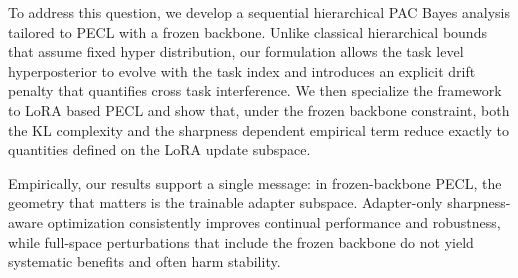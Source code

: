 \documentclass{article}
\theoremstyle{plain}
\theoremstyle{definition}
\theoremstyle{remark}
\begin{document}
To address this question, we develop a sequential hierarchical PAC Bayes analysis tailored to PECL with a frozen backbone. Unlike classical hierarchical bounds that assume fixed hyper distribution, our formulation allows the task level hyperposterior to evolve with the task index and introduces an explicit drift penalty that quantifies cross task interference. We then specialize the framework to LoRA based PECL and show that, under the frozen backbone constraint, both the KL complexity and the sharpness dependent empirical term reduce exactly to quantities defined on the LoRA update subspace.


Empirically, our results support a single message: in frozen-backbone PECL, the geometry that matters is the trainable adapter subspace. Adapter-only sharpness-aware optimization consistently improves continual performance and robustness, while full-space perturbations that include the frozen backbone do not yield systematic benefits and often harm stability. 
\end{document}
